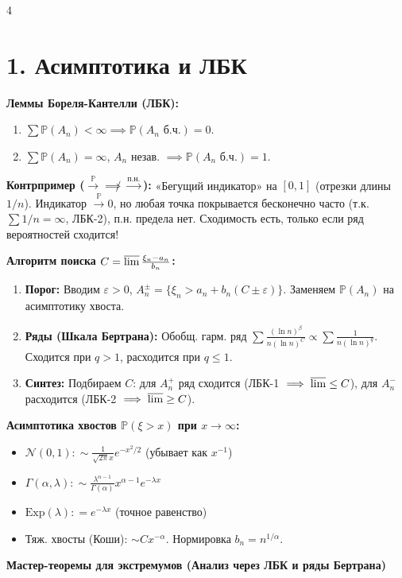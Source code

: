 \documentclass[a4paper, landscape]{article}
\renewcommand{\P}{\mathbb{P}}
\newcommand{\N}{\mathcal{N}}
\begin{document}
\begin{multicols*}{4}

\section*{1. Асимптотика и ЛБК}
\textbf{Леммы Бореля-Кантелли (ЛБК):}
\begin{enumerate}
    \item $\sum \P(A_n) < \infty \implies \P(A_n \text{ б.ч.}) = 0$.
    \item $\sum \P(A_n) = \infty$, $A_n$ незав. $\implies \P(A_n \text{ б.ч.}) = 1$.
\end{enumerate}
\textbf{Контрпример ($\xrightarrow{\P} \not\implies \xrightarrow{п.н.}$):} «Бегущий индикатор» на $[0,1]$ (отрезки длины $1/n$). Индикатор $\xrightarrow{\P} 0$, но любая точка покрывается бесконечно часто (т.к. $\sum 1/n \!=\! \infty$, ЛБК-2), п.н. предела нет. Сходимость есть, только если ряд вероятностей сходится!

\textbf{Алгоритм поиска $C = \varlimsup \frac{\xi_n - a_n}{b_n}$:}
\begin{enumerate}
    \item \textbf{Порог:} Вводим $\varepsilon>0$, $A_n^\pm = \{ \xi_n > a_n + b_n(C \pm \varepsilon) \}$. Заменяем $\P(A_n)$ на асимптотику хвоста.
    \item \textbf{Ряды (Шкала Бертрана):} Обобщ. гарм. ряд $\sum \frac{(\ln n)^\beta}{n(\ln n)^C} \propto \sum \frac{1}{n(\ln n)^q}$. Сходится при $q>1$, расходится при $q \le 1$.
    \item \textbf{Синтез:} Подбираем $C$: для $A_n^+$ ряд сходится (ЛБК-1 $\implies \varlimsup \le C$), для $A_n^-$ расходится (ЛБК-2 $\implies \varlimsup \ge C$).
\end{enumerate}

\textbf{Асимптотика хвостов $\P(\xi > x)$ при $x \to \infty$:}
\begin{itemize}
    \item $\N(0,1): \sim \frac{1}{\sqrt{2\pi} x} e^{-x^2/2}$ (убывает как $x^{-1}$)
    \item $\Gamma(\alpha, \lambda): \sim \frac{\lambda^{\alpha-1}}{\Gamma(\alpha)} x^{\alpha-1} e^{-\lambda x}$
    \item $\text{Exp}(\lambda): = e^{-\lambda x}$ (точное равенство)
    \item Тяж. хвосты (Коши): $\sim C x^{-\alpha}$. Нормировка $b_n=n^{1/\alpha}$.
\end{itemize}

\textbf{Мастер-теоремы для экстремумов (Анализ через ЛБК и ряды Бертрана)} \\


\end{multicols*}
\end{document}
